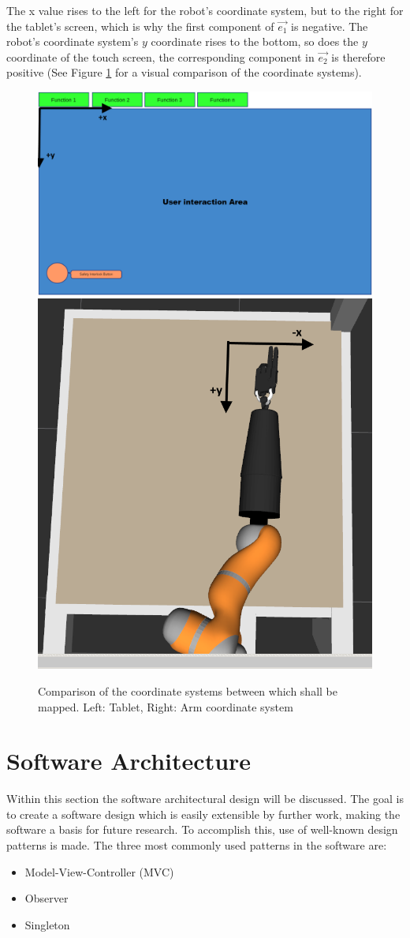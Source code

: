 The x value rises to the left for the robot's coordinate system, but to the right for the tablet's screen, which is why the first component of $\vec{e_1}$ is negative. The robot's coordinate system's $y$ coordinate rises to the bottom, so does the $y$ coordinate of the touch screen, the corresponding component in $\vec{e_2}$ is therefore positive (See Figure \ref{fig:dfmt:coords} for a visual comparison of the coordinate systems).

\begin{figure}
	\caption{\label{fig:dfmt:coords}Comparison of the coordinate systems between which shall be mapped. Left: Tablet, Right: Arm coordinate system}
	\includegraphics[width=0.6\linewidth]{assets/chpt_concepts/dfmt_coord_screen.png}
	\includegraphics[width=0.4\linewidth]{assets/chpt_concepts/dfmt_coord_arm.png}
\end{figure}

\section{Software Architecture}

Within this section the software architectural design will be discussed. The goal is to create a software design which is easily extensible by further work, making the software a basis for future research. To accomplish this, use of well-known design patterns is made. The three most commonly used patterns in the software are:
\begin{itemize}
	\item Model-View-Controller (MVC)
	\item Observer
	\item Singleton
\end{itemize}

